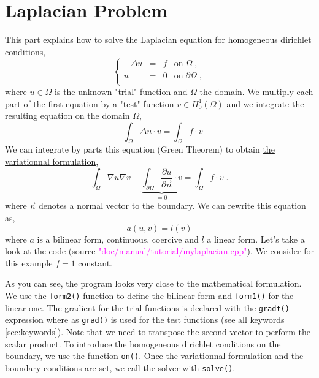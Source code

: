 %


\section{Laplacian Problem}
\label{sec:tuto-mylaplacian}

This part explains how to solve the Laplacian equation 
for homogeneous dirichlet conditions,
%
\begin{equation}
\left\{
\begin{array}{rcll}
    -\Delta u & = & f & \text{on}\;\Omega \;, \\
            u & = & 0 & \text{on}\;\partial\Omega \;,\\
\end{array}
\right.
\end{equation}
%
where $u\in\Omega$ is the unknown "trial" function and $\Omega$ the domain.
%
We multiply each part of the first equation by a "test" function $v\in H_0^1(\Omega)$ 
and we integrate the resulting equation on the domain $\Omega$,
%
\begin{equation}
-\int_\Omega \Delta u \cdot v = \int_\Omega f\cdot v
\end{equation}
%
We can integrate by parts this equation (Green Theorem) to obtain \underline{the variationnal
formulation},
%
\begin{equation}
\int_\Omega \nabla u \nabla v
-\underbrace{ \int_{\partial\Omega} \frac{\partial u}{\partial \vec n}\cdot v }_{= 0}
=\int_\Omega f \cdot v \;.
\end{equation}
%
where $\vec n$ denotes a normal vector to the boundary. We can rewrite this equation as,
%
\begin{equation}
a(u,v)=l(v)
\end{equation}
where $a$ is a bilinear form, continuous, coercive and $l$ a linear form.
Let's take a look at the \feel code
(source \textcolor{magenta}{"doc/manual/tutorial/mylaplacian.cpp"}).
We consider for this example $f=1$ constant.
%
\vspace{2mm}

\vspace{2mm}
%
As you can see, the program looks very close to the mathematical formulation.
We use the \lstinline!form2()! function to define the bilinear form and \lstinline!form1()!
for the linear one. The gradient for the trial functions is declared with the \lstinline!gradt()!
expression where as \lstinline!grad()! is used for the test functions
(see all keywords \ref{sec:keywords}).
Note that we need to transpose the second vector to perform the scalar product.
To introduce the homogeneous dirichlet conditions on the boundary, we use the function
\lstinline!on()!. Once the variationnal formulation and the boundary conditions are set, we call
the solver with \lstinline!solve()!.






